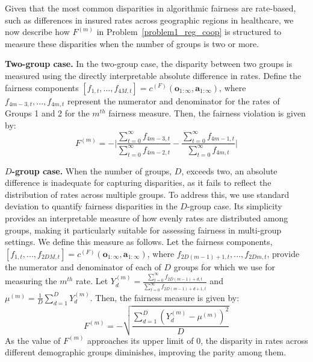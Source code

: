 Given that the most common disparities in algorithmic fairness are rate-based, such as differences in insured rates across geographic regions in healthcare, we now describe how $F^{(m)}$ in Problem~\ref{problem1_reg_coop} is structured to measure these disparities when the number of groups is two or more.

\textbf{Two-group case.} In the two-group case, the disparity between two groups is measured using the directly interpretable absolute difference in rates. Define the fairness components $[f_{1,t},...,f_{4M,t}]=c^{(F)}(\mathbf{o}_{1:\infty},\mathbf{a}_{1:\infty})$, where $f_{4m-3,t},...,f_{4m,t}$ represent the numerator and denominator for the rates of Groups 1 and 2 for the $m^{th}$ fairness measure. Then, the fairness violation is given by:
\begin{equation}
    \label{eq::binary_measure}
    F^{(m)} = -\bigg|\frac{\sum_{t=0}^{\infty}f_{4m-3,t}}{\sum_{t=0}^{\infty}f_{4m-2,t}}-\frac{\sum_{t=0}^{\infty}f_{4m-1,t}}{\sum_{t=0}^{\infty}f_{4m,t}} \bigg|
\end{equation}

\textbf{$D$-group case.} When the number of groups, $D$, exceeds two, an absolute difference is inadequate for capturing disparities, as it fails to reflect the distribution of rates across multiple groups. To address this, we use standard deviation to quantify fairness disparities in the $D$-group case. Its simplicity provides an interpretable measure of how evenly rates are distributed among groups, making it particularly suitable for assessing fairness in multi-group settings. We define this measure as follows. Let the fairness components, $[f_{1,t},...,f_{2DM,t}]=c^{(F)}(\mathbf{o}_{1:\infty},\mathbf{a}_{1:\infty})$, where $f_{2D(m-1)+1,t}, ..., f_{2Dm,t}$, provide the numerator and denominator of each of $D$ groups for which we use for measuring the $m^{th}$ rate. Let $Y_d^{(m)}=\frac{\sum_{t=0}^{\infty}f_{2D(m-1)+d,t}}{\sum_{t=0}^{\infty}f_{2D(m-1)+d+1,t}}$ and $\mu^{(m)}=\frac{1}{D}\sum_{d=1}^DY_d^{(m)}$. Then, the fairness measure is given by:
\begin{equation}
    \label{eq::std_measure}
    F^{(m)} = -\sqrt{ \frac{\sum_{d=1}^D \left(Y_d^{(m)}-\mu^{(m)}\right)^2 }{D}}
\end{equation}
As the value of $F^{(m)}$ approaches its upper limit of 0, the disparity in rates across different demographic groups diminishes, improving the parity among them.